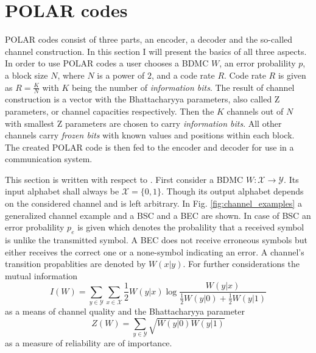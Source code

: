 \documentclass[a4paper,12pt]{scrartcl}
\begin{document}
\section{POLAR codes}
POLAR codes consist of three parts, an encoder, a decoder and the so-called channel construction.
In this section I will present the basics of all three aspects.
In order to use POLAR codes a user chooses a \ac{BDMC} $W$, an error probalility $p$, a block size $N$, where $N$ is a power of $2$, and a code rate $R$.
Code rate $R$ is given as $R = \frac{K}{N}$ with $K$ being the number of \textit{information bits}.
The result of channel construction is a vector with the Bhattacharyya parameters, also called Z parameters, or channel capacities respectively.
Then the $K$ channels out of $N$ with smallest Z parameters are chosen to carry \textit{information bits}.
All other channels carry \textit{frozen bits} with known values and positions within each block.
The created POLAR code is then fed to the encoder and decoder for use in a communication system.

This section is written with respect to \cite{polar:arikan09}.
First consider a \ac{BDMC} $W: \mathcal{X} \rightarrow \mathcal{Y}$.
Its input alphabet shall always be $\mathcal{X} = \{0, 1\}$.
Though its output alphabet depends on the considered channel and is left arbitrary.
In Fig. \ref{fig:channel_examples} a generalized channel example and a \ac{BSC} and a \ac{BEC} are shown.
In case of \ac{BSC} an error probalility $p_e$ is given which denotes the probalility that a received symbol is unlike the transmitted symbol.
A \ac{BEC} does not receive erroneous symbols but either receives the correct one or a none-symbol indicating an error.
A channel's transition propablities are denoted by $W(x|y)$.
For further considerations the mutual information
\begin{equation}
 I(W) = \sum_{y \in \mathcal{Y}} \sum_{x \in \mathcal{X}} \frac{1}{2} W(y|x) \log \frac{W(y|x)}{\frac{1}{2} W(y|0) + \frac{1}{2} W(y|1)}
\end{equation}
as a means of channel quality and the Bhattacharyya parameter
\begin{equation}
 Z(W) = \sum_{y \in \mathcal{Y}} \sqrt{W(y|0) W(y|1)}
\end{equation}
as a measure of reliability are of importance.
\end{document}
